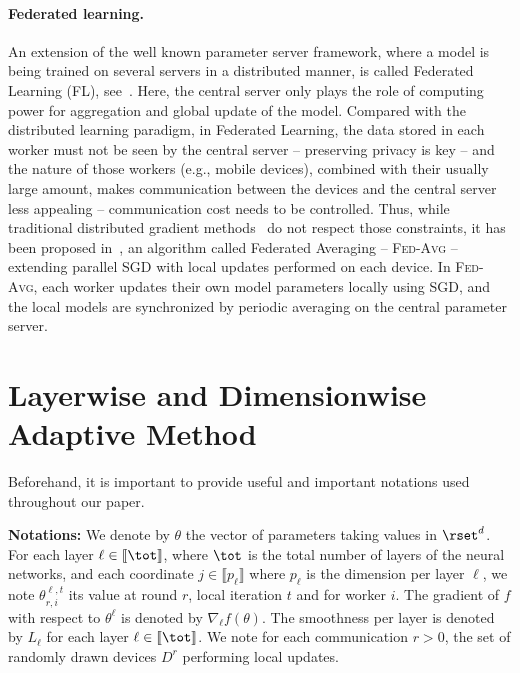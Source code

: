 \documentclass[11pt]{article}
\begin{document}
\paragraph{Federated learning.}
An extension of the well known parameter server framework, where a model is being trained on several servers in a distributed manner, is called Federated Learning (FL), see~\citep{konevcny2016federated}.
Here, the central server only plays the role of computing power for aggregation and global update of the model.
Compared with the distributed learning paradigm, in Federated Learning, the data stored in each worker must not be seen by the central server -- preserving privacy is key -- and the nature of those workers (e.g., mobile devices), combined with their usually large amount, makes communication between the devices and the central server less appealing -- communication cost needs to be controlled.
Thus, while traditional distributed gradient methods~\citep{recht2011hogwild,li2014scaling,zhao2020distributed} do not respect those constraints, it has been proposed in~\citep{mcmahan2017communication}, an algorithm called Federated Averaging -- \textsc{Fed-Avg} -- extending parallel SGD with local updates performed on each device. 
In \textsc{Fed-Avg}, each worker updates their own model parameters locally using SGD, and the local models are synchronized by periodic averaging on the central parameter server.

\vspace{-0.1in}
\section{Layerwise and Dimensionwise Adaptive Method}\label{sec:main}
Beforehand, it is important to provide useful and important notations used throughout our paper.

\vspace{0.05in}
\textbf{Notations:} We denote by $\theta$ the vector of parameters taking values in $\rset^d$. 
For each layer $\ell \in \llbracket \tot \rrbracket$, where $\tot$ is the total number of layers of the neural networks, and each coordinate $j \in \llbracket p_\ell \rrbracket$ where $p_\ell$ is the dimension per layer $\ell$, we note $\theta_{r,i}^{\ell,t}$ its value at round $r$, local iteration $t$ and for worker $i$.
The gradient of $f$ with respect to $\theta^\ell$ is denoted by $\nabla_{\ell} f(\theta)$.
The smoothness per layer is denoted by $L_\ell$ for each layer $\ell \in \llbracket \tot \rrbracket$.
We note for each communication $r>0$, the set of randomly drawn devices $D^{r}$ performing local updates.
\end{document}

